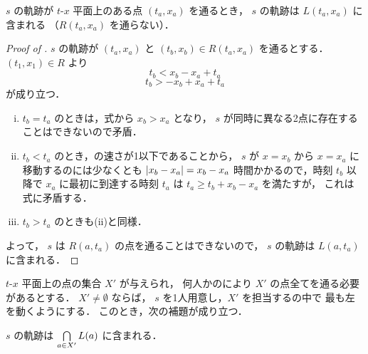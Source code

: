 \begin{lemm}
	\label{lemm:xt_decided_2}
	\server $s$ の軌跡が $t$-$x$ 平面上のある点 $(t_a,x_a)$ を通るとき，
	$s$ の軌跡は $L(t_a,x_a)$ に含まれる （$R(t_a,x_a)$ を通らない）．
\end{lemm}

\begin{proof}[Proof of ]
	$s$ の軌跡が $(t_a,x_a)$ と $(t_b,x_b) \in R(t_a,x_a)$ を通るとする．
	$(t_1, x_1) \in R$ より
	\begin{equation}
		\label{eq:lemm:xt_decided_2_1}
		t_b < x_b - x_a + t_a
	\end{equation}
	\begin{equation}
		\label{eq:lemm:xt_decided_2_2}
		t_b > -x_b + x_a + t_a
	\end{equation}
	が成り立つ．
	\begin{enumerate}[(i)]
		\item 
		$t_b = t_a$ のときは，式から $x_b > x_a$ となり，
		$s$ が同時に異なる2点に存在することはできないので矛盾．
		\item $t_b < t_a$ のとき，\server の速さが1以下であることから，
		$s$ が $x = x_b$ から $x = x_a$ に移動するのには少なくとも $|{x_b - x_a}| = x_b - x_a$ 
		時間かかるので，時刻 $t_b$ 以降で $x_a$ に最初に到達する時刻 $t_a$ は
		$t_a \geq t_b + x_b - x_a$ を満たすが，
		これは 式に矛盾する．
		\item $t_b > t_a$ のときも(ii)と同様．
	\end{enumerate}
	よって， $s$ は $R(a,t_a)$ の点を通ることはできないので，
	$s$ の軌跡は $L(a,t_a)$ に含まれる．
\end{proof}



$t$-$x$ 平面上の点の集合 $X'$ が与えられ，
何人かの\server により $X'$ の点全てを通る必要があるとする．
$X' \neq \emptyset$ ならば，
\server $s$ を1人用意し，$X'$ を担当する\server の中で
最も左を動くようにする．
このとき，次の補題が成り立つ．


\begin{lemm}
	\label{lemm:xt_decided_2_3}
	$s$ の軌跡は $\bigcap\limits_{a \in X'} L(a)$ に含まれる．
\end{lemm}


